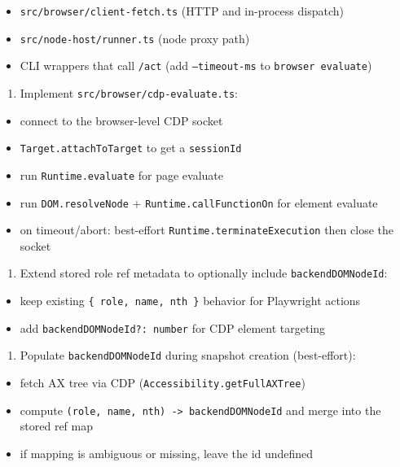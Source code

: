 \begin{itemize}
  \item \texttt{src/browser/client-fetch.ts} (HTTP and in-process dispatch)
  \item \texttt{src/node-host/runner.ts} (node proxy path)
  \item CLI wrappers that call \texttt{/act} (add \texttt{--timeout-ms} to \texttt{browser evaluate})
\end{itemize}

\begin{enumerate}
  \item Implement \texttt{src/browser/cdp-evaluate.ts}:
\end{enumerate}

\begin{itemize}
  \item connect to the browser-level CDP socket
  \item \texttt{Target.attachToTarget} to get a \texttt{sessionId}
  \item run \texttt{Runtime.evaluate} for page evaluate
  \item run \texttt{DOM.resolveNode} + \texttt{Runtime.callFunctionOn} for element evaluate
  \item on timeout/abort: best-effort \texttt{Runtime.terminateExecution} then close the socket
\end{itemize}

\begin{enumerate}
  \item Extend stored role ref metadata to optionally include \texttt{backendDOMNodeId}:
\end{enumerate}

\begin{itemize}
  \item keep existing \texttt{\{ role, name, nth \}} behavior for Playwright actions
  \item add \texttt{backendDOMNodeId?: number} for CDP element targeting
\end{itemize}

\begin{enumerate}
  \item Populate \texttt{backendDOMNodeId} during snapshot creation (best-effort):
\end{enumerate}

\begin{itemize}
  \item fetch AX tree via CDP (\texttt{Accessibility.getFullAXTree})
  \item compute \texttt{(role, name, nth) -> backendDOMNodeId} and merge into the stored ref map
  \item if mapping is ambiguous or missing, leave the id undefined
\end{itemize}


